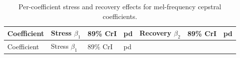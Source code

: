 \documentclass[
  english,
  man,floatsintext]{apa6}
\begin{document}
\begin{longtable}[]{@{}
  >{\raggedright\arraybackslash}p{}
  >{\raggedright\arraybackslash}p{}
  >{\raggedright\arraybackslash}p{}
  >{\raggedright\arraybackslash}p{}
  >{\raggedright\arraybackslash}p{}
  >{\raggedright\arraybackslash}p{}
  >{\raggedright\arraybackslash}p{}@{}}
\caption{\label{tab:mfcc-effects} Per-coefficient stress and recovery effects for mel-frequency cepstral coefficients.}\tabularnewline
\toprule\noalign{}
\begin{minipage}[b]{\linewidth}\raggedright
Coefficient
\end{minipage} & \begin{minipage}[b]{\linewidth}\raggedright
Stress \(\beta_1\)
\end{minipage} & \begin{minipage}[b]{\linewidth}\raggedright
89\% CrI
\end{minipage} & \begin{minipage}[b]{\linewidth}\raggedright
pd
\end{minipage} & \begin{minipage}[b]{\linewidth}\raggedright
Recovery \(\beta_2\)
\end{minipage} & \begin{minipage}[b]{\linewidth}\raggedright
89\% CrI
\end{minipage} & \begin{minipage}[b]{\linewidth}\raggedright
pd
\end{minipage} \\
\midrule\noalign{}
\endfirsthead
\toprule\noalign{}
\begin{minipage}[b]{\linewidth}\raggedright
Coefficient
\end{minipage} & \begin{minipage}[b]{\linewidth}\raggedright
Stress \(\beta_1\)
\end{minipage} & \begin{minipage}[b]{\linewidth}\raggedright
89\% CrI
\end{minipage} & \begin{minipage}[b]{\linewidth}\raggedright
pd
\end{minipage} & \begin{minipage}[b]{\linewidth}\raggedright

\end{minipage}
\end{longtable}
\end{document}
